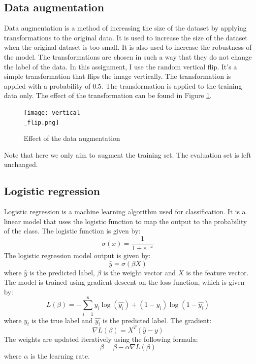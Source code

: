 \documentclass{article}
\begin{document}
\subsection{Data augmentation}
\label{subsec:augmentation}
Data augmentation is a method of increasing the size of the dataset by applying transformations to the original data. It is used to increase the size of the dataset when the original dataset is too small. It is also used to increase the robustness of the model. The transformations are chosen in such a way that they do not change the label of the data. In this assignment, I use the random vertical flip. It's a simple transformation that flips the image vertically. The transformation is applied with a probability of 0.5. The transformation is applied to the training data only. The effect of the transformation can be found in Figure \ref{fig:augmentation}.

\begin{figure}[ht]
    \centering
    \texttt{[image: vertical\\\_flip.png]}
    \caption{Effect of the data augmentation}
    \label{fig:augmentation}
\end{figure}
Note that here we only aim to augment the training set. The evaluation set is left unchanged.

\subsection{Logistic regression}
\label{subsec:logistic_regression}
Logistic regression is a machine learning algorithm used for classification. It is a linear model that uses the logistic function to map the output to the probability of the class. The logistic function is given by:
\begin{equation}
    \sigma(x) = \frac{1}{1 + e^{-x}}
\end{equation}
The logistic regression model output is given by:
\begin{equation}
    \hat{y} = \sigma(\beta X)
\end{equation}
where $\hat{y}$ is the predicted label, $\beta$ is the weight vector and $X$ is the feature vector. The model is trained using gradient descent on the loss function, which is given by:
\begin{equation}
    L(\beta) = -\sum_{i=1}^{n} y_i \log(\hat{y_i}) + (1 - y_i) \log(1 - \hat{y_i})
\end{equation}
where $y_i$ is the true label and $\hat{y_i}$ is the predicted label.
The gradient:
\begin{equation}
    \nabla L(\beta) = X^T(\hat{y} - y)
\end{equation}
The weights are updated iteratively using the following formula:
\begin{equation}
    \beta = \beta - \alpha \nabla L(\beta)
\end{equation}
where $\alpha$ is the learning rate.
\end{document}
